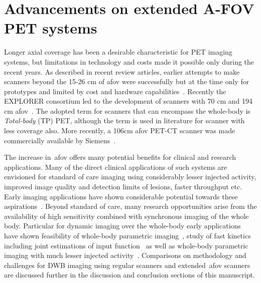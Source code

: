 \section{Advancements on extended A-FOV PET systems}
Longer axial coverage has been a desirable characteristic for PET imaging systems, but limitations in technology and costs made it possible only during the recent years. 
As described in recent review articles, earlier attempts to make scanners beyond the 15-26 cm of \gls{afov} were successfully but at the time only for prototypes and limited by cost and hardware capabilities~\cite{Vandenberghe2020,Surti2020}.
Recently the EXPLORER consortium led to the development of scanners with 70 cm and 194 cm \gls{afov}~\cite{Karp2020,Cherry2017}. The adopted term for scanners that can encompass the whole-body is \textit{Total-body} (TP) PET, although the term is used in literature for scanner with less coverage also. More recently, a 106cm \gls{afov} PET-CT scanner was made commercially available by Siemens~\cite{Siegel2020}. 

The increase in~\gls{afov} offers many potential benefits for clinical and research applications. 
Many of the direct clinical applications of such systems are envisioned for standard of care imaging using considerably lesser injected activity, improved image quality and detection limits of lesions, faster throughput etc. Early imaging applications have shown considerable potential towards these aspirations~\cite{Badawi2019,Pantel2020}.
Beyond standard of care, many research opportunities arise from the availability of high sensitivity combined with synchronous imaging of the whole body. 
Particular for dynamic imaging over the whole-body early applications have shown feasibility of whole-body parametric imaging~\cite{Zhang2020a,Zhang2020b,Wang208}, study of fast kinetics including joint estimations of input function~\cite{Feng2019,Feng2021} as well as whole-body parametric imaging with much lesser injected activity~\cite{Liu2021}.
Comparisons on methodology and challenges for DWB imaging using regular scanners and extended~\gls{afov} scanners are discussed further in the discussion and conclusion sections of this manuscript.
